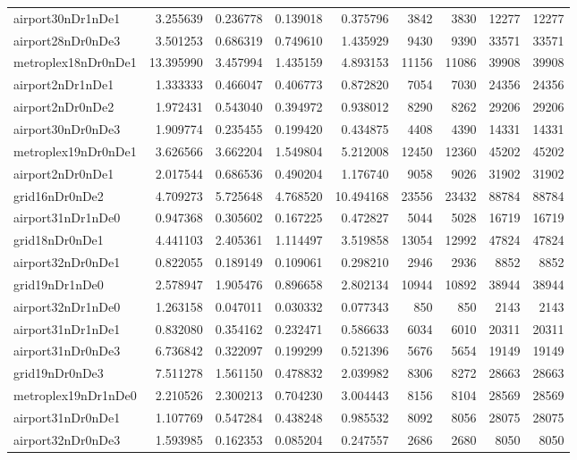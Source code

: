 \begin{longtable}{|l|r|r|r|r|r|r|r|r|}
airport30nDr1nDe1 & 3.255639 & 0.236778 & 0.139018 & 0.375796 & 3842 & 3830 & 12277 & 12277 \\
airport28nDr0nDe3 & 3.501253 & 0.686319 & 0.749610 & 1.435929 & 9430 & 9390 & 33571 & 33571 \\
metroplex18nDr0nDe1 & 13.395990 & 3.457994 & 1.435159 & 4.893153 & 11156 & 11086 & 39908 & 39908 \\
airport2nDr1nDe1 & 1.333333 & 0.466047 & 0.406773 & 0.872820 & 7054 & 7030 & 24356 & 24356 \\
airport2nDr0nDe2 & 1.972431 & 0.543040 & 0.394972 & 0.938012 & 8290 & 8262 & 29206 & 29206 \\
airport30nDr0nDe3 & 1.909774 & 0.235455 & 0.199420 & 0.434875 & 4408 & 4390 & 14331 & 14331 \\
metroplex19nDr0nDe1 & 3.626566 & 3.662204 & 1.549804 & 5.212008 & 12450 & 12360 & 45202 & 45202 \\
airport2nDr0nDe1 & 2.017544 & 0.686536 & 0.490204 & 1.176740 & 9058 & 9026 & 31902 & 31902 \\
grid16nDr0nDe2 & 4.709273 & 5.725648 & 4.768520 & 10.494168 & 23556 & 23432 & 88784 & 88784 \\
airport31nDr1nDe0 & 0.947368 & 0.305602 & 0.167225 & 0.472827 & 5044 & 5028 & 16719 & 16719 \\
grid18nDr0nDe1 & 4.441103 & 2.405361 & 1.114497 & 3.519858 & 13054 & 12992 & 47824 & 47824 \\
airport32nDr0nDe1 & 0.822055 & 0.189149 & 0.109061 & 0.298210 & 2946 & 2936 & 8852 & 8852 \\
grid19nDr1nDe0 & 2.578947 & 1.905476 & 0.896658 & 2.802134 & 10944 & 10892 & 38944 & 38944 \\
airport32nDr1nDe0 & 1.263158 & 0.047011 & 0.030332 & 0.077343 & 850 & 850 & 2143 & 2143 \\
airport31nDr1nDe1 & 0.832080 & 0.354162 & 0.232471 & 0.586633 & 6034 & 6010 & 20311 & 20311 \\
airport31nDr0nDe3 & 6.736842 & 0.322097 & 0.199299 & 0.521396 & 5676 & 5654 & 19149 & 19149 \\
grid19nDr0nDe3 & 7.511278 & 1.561150 & 0.478832 & 2.039982 & 8306 & 8272 & 28663 & 28663 \\
metroplex19nDr1nDe0 & 2.210526 & 2.300213 & 0.704230 & 3.004443 & 8156 & 8104 & 28569 & 28569 \\
airport31nDr0nDe1 & 1.107769 & 0.547284 & 0.438248 & 0.985532 & 8092 & 8056 & 28075 & 28075 \\
airport32nDr0nDe3 & 1.593985 & 0.162353 & 0.085204 & 0.247557 & 2686 & 2680 & 8050 & 8050 \\

\end{longtable}
